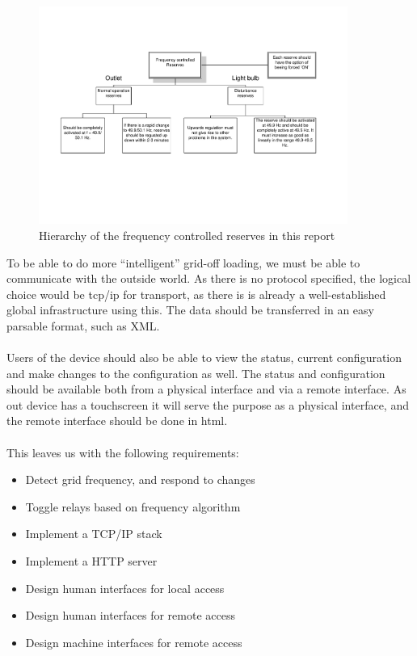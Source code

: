 \begin{figure}[!h]
  \centering
  \label{fig:reserver_demands}
  \includegraphics[width=0.9\textwidth]{figs/Demands_for_automatic_active_reserves.pdf}
  \caption{Hierarchy of the frequency controlled reserves in this report}
\end{figure}
To be able to do more ``intelligent'' grid-off loading, we must be able to communicate with the outside world. As there is no protocol specified, the logical choice would be tcp/ip for transport, as there is is already a well-established global infrastructure using this. The data should be transferred in an easy parsable format, such as XML.\\\\
Users of the device should also be able to view the status, current configuration and make changes to the configuration as well. The status and configuration should be available both from a physical interface and via a remote interface. As out device has a touchscreen it will serve the purpose as a physical interface, and the remote interface should be done in html.\\\\
This leaves us with the following requirements:
\begin{itemize}
\item Detect grid frequency, and respond to changes
\item Toggle relays based on frequency algorithm
\item Implement a TCP/IP stack
\item Implement a HTTP server
\item Design human interfaces for local access
\item Design human interfaces for remote access
\item Design machine interfaces for remote access
\end{itemize}


